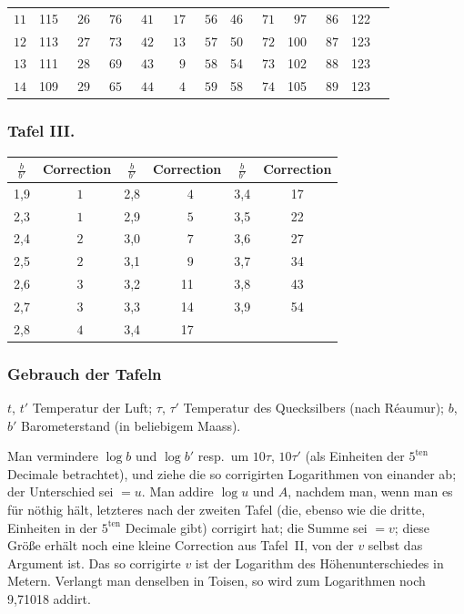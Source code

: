 \documentclass[12pt,a4paper]{article}
\theoremstyle{plain}
\theoremstyle{definition}
\theoremstyle{remark}
\begin{document}
\begin{tabular}{r|r|r|r|r|r|r|r|r|r|r|r|r}
$11$ & 115 & $\phantom{0}26$ & $\phantom{0}76$ & $\phantom{0}41$ & $\phantom{0}17$ & $\phantom{0}56$ & 46 & $\phantom{0}71$ & 97 & $\phantom{0}86$ & 122 \\
$12$ & 113 & $\phantom{0}27$ & $\phantom{0}73$ & $\phantom{0}42$ & $\phantom{0}13$ & $\phantom{0}57$ & 50 & $\phantom{0}72$ & 100 & $\phantom{0}87$ & 123 \\
$13$ & 111 & $\phantom{0}28$ & $\phantom{0}69$ & $\phantom{0}43$ & $\phantom{0\phantom{0}}9$ & $\phantom{0}58$ & 54 & $\phantom{0}73$ & 102 & $\phantom{0}88$ & 123 \\
$14$ & 109 & $\phantom{0}29$ & $\phantom{0}65$ & $\phantom{0}44$ & $\phantom{0\phantom{0}}4$ & $\phantom{0}59$ & 58 & $\phantom{0}74$ & 105 & $\phantom{0}89$ & 123 \\
\hline
\end{tabular}

\subsubsection*{Tafel III.}

\medskip
\noindent
\begin{tabular}{c|c||c|c||c|c}
\hline
$\frac{b}{b'}$ & Correction & $\frac{b}{b'}$ & Correction & $\frac{b}{b'}$ & Correction \\
\hline
1{,}9 & $\phantom{0}1$ & 2{,}8 & $\phantom{0}4$ & 3{,}4 & 17 \\
2{,}3 & $\phantom{0}1$ & 2{,}9 & $\phantom{0}5$ & 3{,}5 & 22 \\
2{,}4 & $\phantom{0}2$ & 3{,}0 & $\phantom{0}7$ & 3{,}6 & 27 \\
2{,}5 & $\phantom{0}2$ & 3{,}1 & $\phantom{0}9$ & 3{,}7 & 34 \\
2{,}6 & $\phantom{0}3$ & 3{,}2 & 11 & 3{,}8 & 43 \\
2{,}7 & $\phantom{0}3$ & 3{,}3 & 14 & 3{,}9 & 54 \\
2{,}8 & $\phantom{0}4$ & 3{,}4 & 17 & & \\
\hline
\end{tabular}

\subsubsection*{Gebrauch der Tafeln}

$t$, $t'$ Temperatur der Luft; $\tau$, $\tau'$ Temperatur des Quecksilbers (nach R\'eaumur); $b$, $b'$ Barometerstand (in beliebigem Maass).

Man vermindere $\log b$ und $\log b'$ resp.\ um $10\tau$, $10\tau'$ (als Einheiten der $5^{\text{ten}}$ Decimale betrachtet), und ziehe die so corrigirten Logarithmen von einander ab; der Unterschied sei $= u$. Man addire $\log u$ und $A$, nachdem man, wenn man es f\"ur n\"othig h\"alt, letzteres nach der zweiten Tafel (die, ebenso wie die dritte, Einheiten in der $5^{\text{ten}}$ Decimale gibt) corrigirt hat; die Summe sei $= v$; diese Gr\"o\ss e erh\"alt noch eine kleine Correction aus Tafel~II, von der $v$ selbst das Argument ist. Das so corrigirte $v$ ist der Logarithm des H\"ohenunterschiedes in Metern. Verlangt man denselben in Toisen, so wird zum Logarithmen noch 9{,}71018 addirt.
\end{document}
